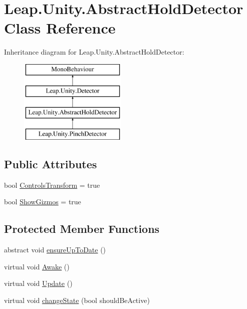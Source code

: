\hypertarget{class_leap_1_1_unity_1_1_abstract_hold_detector}{}\section{Leap.\+Unity.\+Abstract\+Hold\+Detector Class Reference}
\label{class_leap_1_1_unity_1_1_abstract_hold_detector}
Inheritance diagram for Leap.\+Unity.\+Abstract\+Hold\+Detector\+:\begin{figure}[H]
\begin{center}
\leavevmode
\includegraphics[height=4.000000cm]{class_leap_1_1_unity_1_1_abstract_hold_detector}
\end{center}
\end{figure}
\subsection*{Public Attributes}
\begin{DoxyCompactItemize}
\item 
bool \mbox{\hyperlink{class_leap_1_1_unity_1_1_abstract_hold_detector_a2171bcb98c503c7f24fa3508895a99cc}{Controls\+Transform}} = true
\item 
bool \mbox{\hyperlink{class_leap_1_1_unity_1_1_abstract_hold_detector_a7dfb2c84323d68f8ab583deaec8bcef2}{Show\+Gizmos}} = true
\end{DoxyCompactItemize}
\subsection*{Protected Member Functions}
\begin{DoxyCompactItemize}
\item 
abstract void \mbox{\hyperlink{class_leap_1_1_unity_1_1_abstract_hold_detector_a89541e346c0eb1a0212944c94e407b82}{ensure\+Up\+To\+Date}} ()
\item 
virtual void \mbox{\hyperlink{class_leap_1_1_unity_1_1_abstract_hold_detector_a49f88a2f7de4f6c35309c32bbb69ae2b}{Awake}} ()
\item 
virtual void \mbox{\hyperlink{class_leap_1_1_unity_1_1_abstract_hold_detector_a7bfa8e18c118ae2d4b19f39f001e3f15}{Update}} ()
\item 
virtual void \mbox{\hyperlink{class_leap_1_1_unity_1_1_abstract_hold_detector_a6bca8f8ac18c3ca93c3d4a5b9584477c}{change\+State}} (bool should\+Be\+Active)
\end{DoxyCompactItemize}
